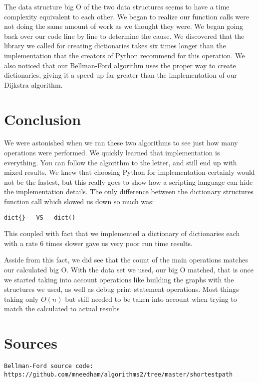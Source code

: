 \documentclass{article}
\begin{document}
The data structure big O of the two data structures seems to have a time complexity equivalent to each other. 
We began to realize our function calls were not doing the same amount of work as we thought they were. We began going back over our code line by line to determine the cause. We discovered that the library we called for creating dictionaries takes six times longer than the implementation that the creators of Python recommend for this operation. We also noticed that our Bellman-Ford algorithm uses the proper way to create dictionaries, giving it a speed up far greater than the implementation of our Dijkstra algorithm.

\section{Conclusion}
We were astonished when we ran these two algorithms to see just how many operations were performed. We quickly learned that implementation is everything. You can follow the algorithm to the letter, and still end up with mixed results. We knew that choosing Python for implementation certainly would not be the fastest, but this really goes to show how a scripting language can hide the implementation details. The only difference between the dictionary structures function call which slowed us down so much was:

\begin{verbatim}
dict{}   VS   dict()
\end{verbatim}

This coupled with fact that we implemented a dictionary of dictionaries each with a rate 6 times slower gave us very poor run time results.

Asside from this fact, we did see that the count of the main operations matches our calculated big O. With the data set we used, our big O matched, that is once we started taking into account operations like building the graphs with the structures we used, as well as debug print statement operations. Most things taking only $O(n)$ but still needed to be taken into account when trying to match the calculated to actual results
\section{Sources}

\begin{verbatim}
Bellman-Ford source code:
https://github.com/mneedham/algorithms2/tree/master/shortestpath
\end{verbatim}
\end{document}
